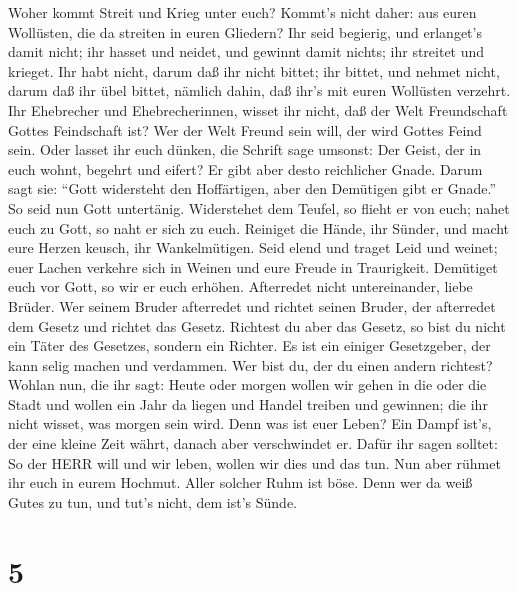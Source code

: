  Woher kommt Streit und Krieg unter euch? Kommt's nicht
daher: aus euren Wollüsten, die da streiten in euren Gliedern?
 Ihr seid begierig, und erlanget's damit nicht; ihr hasset
und neidet, und gewinnt damit nichts; ihr streitet und krieget. Ihr habt
nicht, darum daß ihr nicht bittet;  ihr bittet, und nehmet
nicht, darum daß ihr übel bittet, nämlich dahin, daß ihr's mit euren
Wollüsten verzehrt.  Ihr Ehebrecher und Ehebrecherinnen,
wisset ihr nicht, daß der Welt Freundschaft Gottes Feindschaft ist? Wer
der Welt Freund sein will, der wird Gottes Feind sein.  Oder
lasset ihr euch dünken, die Schrift sage umsonst: Der Geist, der in euch
wohnt, begehrt und eifert?  Er gibt aber desto reichlicher
Gnade. Darum sagt sie: ``Gott widersteht den Hoffärtigen, aber den
Demütigen gibt er Gnade.''  So seid nun Gott untertänig.
Widerstehet dem Teufel, so flieht er von euch;  nahet euch
zu Gott, so naht er sich zu euch. Reiniget die Hände, ihr Sünder, und
macht eure Herzen keusch, ihr Wankelmütigen.  Seid elend und
traget Leid und weinet; euer Lachen verkehre sich in Weinen und eure
Freude in Traurigkeit.  Demütiget euch vor Gott, so wir er
euch erhöhen.  Afterredet nicht untereinander, liebe
Brüder. Wer seinem Bruder afterredet und richtet seinen Bruder, der
afterredet dem Gesetz und richtet das Gesetz. Richtest du aber das
Gesetz, so bist du nicht ein Täter des Gesetzes, sondern ein Richter.
 Es ist ein einiger Gesetzgeber, der kann selig machen und
verdammen. Wer bist du, der du einen andern richtest? 
Wohlan nun, die ihr sagt: Heute oder morgen wollen wir gehen in die oder
die Stadt und wollen ein Jahr da liegen und Handel treiben und gewinnen;
 die ihr nicht wisset, was morgen sein wird. Denn was ist
euer Leben? Ein Dampf ist's, der eine kleine Zeit währt, danach aber
verschwindet er.  Dafür ihr sagen solltet: So der HERR will
und wir leben, wollen wir dies und das tun.  Nun aber
rühmet ihr euch in eurem Hochmut. Aller solcher Ruhm ist böse.
 Denn wer da weiß Gutes zu tun, und tut's nicht, dem ist's
Sünde.

\hypertarget{section-4}{%
\section{5}\label{section-4}}

